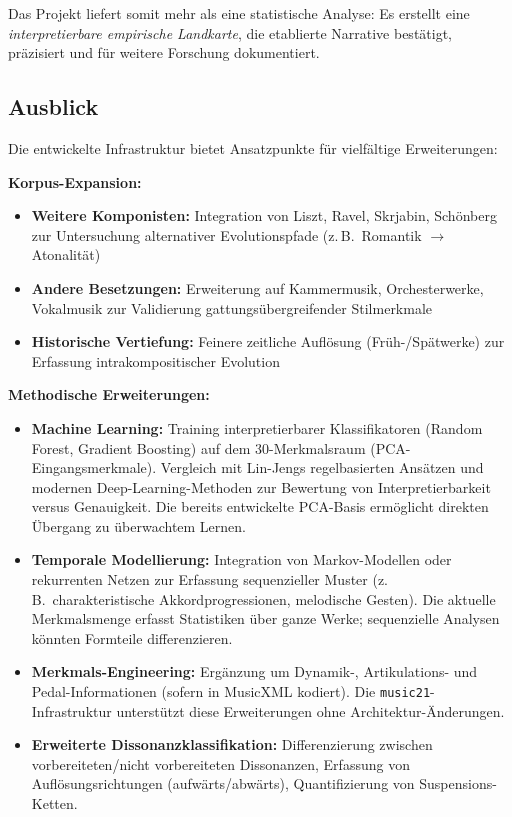 \documentclass[12pt,a4paper]{article}
\theoremstyle{definition}
\begin{document}
Das Projekt liefert somit mehr als eine statistische Analyse: Es erstellt eine \emph{interpretierbare empirische Landkarte}, die etablierte Narrative bestätigt, präzisiert und für weitere Forschung dokumentiert.

\subsection{Ausblick}
Die entwickelte Infrastruktur bietet Ansatzpunkte für vielfältige Erweiterungen:

\textbf{Korpus-Expansion:}
\begin{itemize}
    \item \textbf{Weitere Komponisten:} Integration von Liszt, Ravel, Skrjabin, Schönberg zur Untersuchung alternativer Evolutionspfade (z.\,B.\ Romantik $\to$ Atonalität)
    \item \textbf{Andere Besetzungen:} Erweiterung auf Kammermusik, Orchesterwerke, Vokalmusik zur Validierung gattungsübergreifender Stilmerkmale
    \item \textbf{Historische Vertiefung:} Feinere zeitliche Auflösung (Früh-/Spätwerke) zur Erfassung intrakompositischer Evolution
\end{itemize}

\textbf{Methodische Erweiterungen:}
\begin{itemize}
    \item \textbf{Machine Learning:} Training interpretierbarer Klassifikatoren (Random Forest, Gradient Boosting) auf dem 30-Merkmalsraum (PCA-Eingangsmerkmale). Vergleich mit Lin-Jengs regelbasierten Ansätzen und modernen Deep-Learning-Methoden zur Bewertung von Interpretierbarkeit versus Genauigkeit. Die bereits entwickelte PCA-Basis ermöglicht direkten Übergang zu überwachtem Lernen.
    \item \textbf{Temporale Modellierung:} Integration von Markov-Modellen oder rekurrenten Netzen zur Erfassung sequenzieller Muster (z.\,B.\ charakteristische Akkordprogressionen, melodische Gesten). Die aktuelle Merkmalsmenge erfasst Statistiken über ganze Werke; sequenzielle Analysen könnten Formteile differenzieren.
    \item \textbf{Merkmals-Engineering:} Ergänzung um Dynamik-, Artikulations- und Pedal-Informationen (sofern in MusicXML kodiert). Die \texttt{music21}-Infrastruktur unterstützt diese Erweiterungen ohne Architektur-Änderungen.
    \item \textbf{Erweiterte Dissonanzklassifikation:} Differenzierung zwischen vorbereiteten/nicht vorbereiteten Dissonanzen, Erfassung von Auflösungsrichtungen (aufwärts/abwärts), Quantifizierung von Suspensions-Ketten.
\end{itemize}
\end{document}
